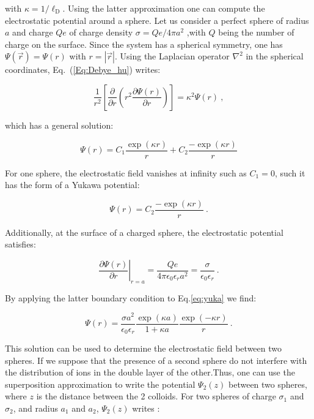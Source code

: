 with $\kappa = 1/\ell _\mathrm{D}$. Using the latter approximation one can compute the electrostatic potential around a sphere. Let us consider a perfect sphere of radius $a$ and charge $Qe$ of charge density $\sigma = Qe/4\pi a^2$ ,with $Q$ being the number of charge on the surface. Since the system has a spherical symmetry, one has $\Psi (\vec{r}) = \Psi(r)$ with $r = |\vec{r}|$. Using the Laplacian operator $\nabla ^2$ in the spherical coordinates, Eq.~(\ref{Eq:Debye_hu}) writes:

\begin{equation}
	\frac{1}{r^2}\left[\frac{\partial}{\partial r} \left(r^2 \frac{\partial \Psi(r)}{\partial r}\right)\right] = \kappa^2  \Psi (r) ~,
\end{equation}

which has a general solution:

\begin{equation}
	\Psi(r) = C_1 \frac{\exp(\kappa r)}{r} + C_2 \frac{-\exp(\kappa r)}{r}
\end{equation}

For one sphere, the electrostatic field vanishes at infinity such as $C_1 = 0$, such it has the form of a Yukawa potential:

\begin{equation}
	\Psi (r) = C_2 \frac{-\exp(\kappa r)}{r} ~.
	\label{eq:yuka}
\end{equation}

Additionally, at the surface of a charged sphere, the electrostatic potential satisfies:

\begin{equation}
	\left. \frac{\partial{\Psi (r)}}{\partial r} \right|_{r=a} = \frac{Qe}{4 \pi \epsilon_0 \epsilon_r a^2}  = \frac{\sigma}{\epsilon_0 \epsilon_r} ~.
\end{equation}

By applying the latter boundary condition to Eq.\ref{eq:yuka} we find:

\begin{equation}
	\Psi (r) = \frac{\sigma a^2}{\epsilon_0 \epsilon_r} \frac{\exp (\kappa a)}{1 + \kappa a} \frac{\exp (-\kappa r)}{r} ~.
\end{equation}

This solution can be used to determine the electrostatic field between two spheres. If we suppose that the presence of a second sphere do not interfere with the distribution of ions in the double layer of the other.Thus, one can use the superposition approximation to write the potential $\Psi _2 (z)$ between two spheres, where $z$ is the distance between the 2 colloids. For two spheres of charge $\sigma_1$ and $\sigma_2$, and radius $a_1$ and $a_2$, $\Psi_2 (z)$ writes \cite{bell_approximate_1970}:

